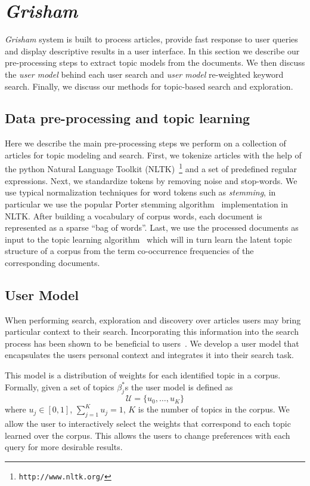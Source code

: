 \documentclass[letterpaper]{article}
\newcommand{\system}{\textsl{Grisham}\xspace}
\begin{document}
\section{\system}
\label{sec:system}


{\system} system is built to process articles,
provide fast response to user queries and display descriptive
results in a user interface.
In this section we describe our pre-processing steps to extract
topic models from the documents.
We then discuss the \textsl{user model} behind each user search and 
\textsl{user model} re-weighted keyword search.
Finally, we discuss our methods for topic-based search and exploration.



\subsection{Data pre-processing and topic learning}

Here we describe the main pre-processing steps we perform on a 
collection of articles for topic modeling and search. First, 
we tokenize articles with the help of the python 
Natural Language Toolkit (NLTK)~\footnote{\texttt{http://www.nltk.org/}} and a set of 
predefined regular expressions. Next, we standardize tokens by 
removing noise and stop-words. We use typical normalization 
techniques for word tokens such as \textsl{stemming}, in particular we use the popular Porter stemming algorithm~\cite{Porter1980} 
implementation in NLTK\@. 
After building a vocabulary of corpus words, each document is represented as a sparse ``bag of words''.
Last, we use the processed documents as input to the topic 
learning algorithm~\cite{hoffman2010online} which will in turn learn 
the latent topic structure of a corpus from the term co-occurrence 
frequencies of the corresponding documents. 



\subsection{User Model}
When performing search, exploration and discovery over articles 
users may bring particular context to their search. Incorporating 
this information into the search process has been shown to be 
beneficial to users~\cite{DZSRWJ,MZPGSOL}. We develop a user model 
that encapsulates the users personal context and integrates it into 
their search task. 

This model is a distribution of weights for each identified topic in 
a corpus. Formally, given a set of topics $\beta_j^{*}$s the user 
model is defined as
$$
\mathcal{U} = \{u_0, \ldots, u_{K}\}
$$
where $u_j \in [0,1]$, $\sum_{j = 1}^K u_j = 1$, $K$ is the number 
of topics in the corpus.
We allow the user to interactively select the weights that correspond to
each topic learned over the corpus. This allows the users to change preferences with each query
for more desirable results.
\end{document}
